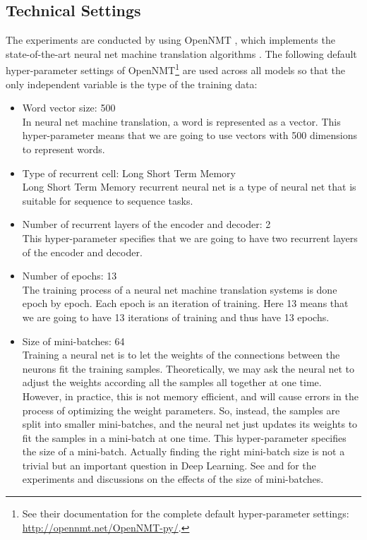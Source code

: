 \documentclass[final]{ua-thesis}
\numberwithin{equation}{section}
\begin{document}
\subsection{Technical Settings}
The experiments are conducted by using OpenNMT \citep{2017opennmt}, which implements the state-of-the-art neural net machine translation algorithms \citep{cho2014properties, cho2014learning, bahdanau2014neural}.
The following default hyper-parameter settings of OpenNMT\footnote{See their documentation for the complete default hyper-parameter settings: \url{http://opennmt.net/OpenNMT-py/}.} are used across all models so that the only independent variable is the type of the training data:
	\begin{itemize}
	\item Word vector size: 500\\
	In neural net machine translation, a word is represented as a vector. This hyper-parameter means that we are going to use vectors with 500 dimensions to represent words.
	\item Type of recurrent cell: Long Short Term Memory\\
	Long Short Term Memory recurrent neural net is a type of neural net that is suitable for sequence to sequence tasks.  
	\item Number of recurrent layers of the encoder and decoder: 2\\
	This hyper-parameter specifies that we are going to have two recurrent layers of the encoder and decoder. 
	\item Number of epochs: 13\\
	The training process of a neural net machine translation systems is done epoch by epoch. Each epoch is an iteration of training. Here 13 means that we are going to have 13 iterations of training and thus have 13 epochs. 
	\item Size of mini-batches: 64\\
	Training a neural net is to let the weights of the connections between the neurons fit the training samples. Theoretically, we may ask the neural net to adjust the weights according all the samples all together at one time. However, in practice, this is not memory efficient, and will cause errors in the process of optimizing the weight parameters. So, instead, the samples are split into smaller mini-batches, and the neural net just updates its weights to fit the samples in a mini-batch at one time. This hyper-parameter specifies the size of a mini-batch. Actually finding the right mini-batch size is not a trivial but an important question in Deep Learning. See \citet{DBLP:journals/corr/KeskarMNST16} and \citet{DBLP:journals/corr/abs-1711-00489} for the experiments and discussions on the effects of the size of mini-batches. 
	\end{itemize}
\end{document}
